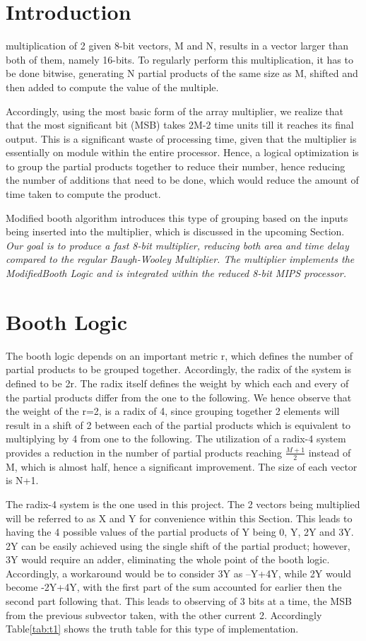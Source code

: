 \documentclass[journal]{IEEEtran}
\begin{document}
\section{Introduction}
multiplication of 2 given 8-bit vectors, M and N, results in a vector larger than both of them, namely 16-bits. To regularly perform this multiplication, it has to be done bitwise, generating N partial products of the same size as M, shifted and then added to compute the value of the multiple.

Accordingly, using the most basic form of the array multiplier, we realize that that the most significant bit (MSB) takes 2M-2 time units till it reaches its final output. This is a significant waste of processing time, given that the multiplier is essentially on module within the entire processor. Hence, a logical optimization is to group the partial products together to reduce their number, hence reducing the number of additions that need to be done, which would reduce the amount of time taken to compute the product.

Modified booth algorithm introduces this type of grouping based on the inputs being inserted into the multiplier, which is discussed in the upcoming Section.
\emph{Our goal is to produce a fast 8-bit multiplier, reducing both area and time delay compared to the regular Baugh-Wooley Multiplier. The multiplier implements the ModifiedBooth Logic and is integrated within the reduced 8-bit MIPS processor.
}

\section{Booth Logic}

The booth logic depends on an important metric r, which defines the number of partial products to be grouped together. Accordingly, the radix of the system is defined to be 2r. The radix itself defines the weight by which each and every of the partial products differ from the one to the following. We hence observe that the weight of the r=2, is a radix of 4, since grouping together 2 elements will result in a shift of 2 between each of the partial products which is equivalent to multiplying by 4 from one to the following. The utilization of a radix-4 system provides a reduction in the number of partial products reaching $\frac{M+1}{2}$
instead of M, which is almost half, hence a significant improvement. The size of each vector is N+1.

The radix-4 system is the one used in this project. The 2 vectors being multiplied will be referred to as X and Y for convenience within this Section. This leads to having the 4 possible values of the partial products of Y being 0, Y, 2Y and 3Y. 2Y can be easily achieved using the single shift of the partial product; however, 3Y would require an adder, eliminating the whole point of the booth logic. Accordingly, a workaround would be to consider 3Y as –Y+4Y, while 2Y would become -2Y+4Y, with the first part of the sum accounted for earlier then the second part following that. This leads to observing of 3 bits at a time, the MSB from the previous subvector taken, with the other current 2. Accordingly Table\ref{tab:t1} shows the truth table for this type of implementation.
\end{document}

